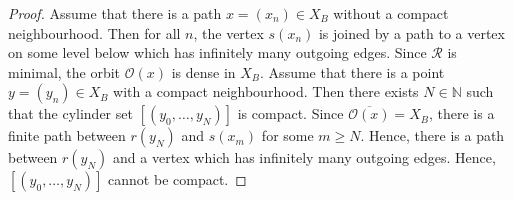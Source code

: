 \documentclass[11pt, twoside]{amsart}
\theoremstyle{definition}
\theoremstyle{remark}
\theoremstyle{plain}
\newtheorem{theorem}[definition]{Theorem}
\newcommand{\tcr}{\textcolor{red}}
\def\ov{\overline}
\numberwithin{equation}{section}
\begin{document}
\begin{proof}
    Assume that there is a path $x = (x_n) \in X_B$ without a compact neighbourhood. Then for all $n$, the vertex $s(x_{n})$ is joined by a path to a vertex on some level below which has infinitely many outgoing edges. 
    Since $\mathcal{R}$ is minimal, the orbit $\mathcal{O}(x)$ is dense in $X_B$. Assume that there is a point $y = (y_n) \in X_B$ with a compact neighbourhood. Then there exists $N \in \mathbb{N}$ such that the cylinder set $[(y_0, \ldots, y_N)]$ is compact. Since $\ov{\mathcal{O}(x)} = X_B$, there is a finite path between $r(y_N)$ and $s(x_m)$ for some $m \geq N$. Hence, there is a path between $r(y_N)$ and a vertex which has infinitely many outgoing edges. Hence, $[(y_0, \ldots, y_N)]$ cannot be compact. 
\end{proof}
















\end{document}
